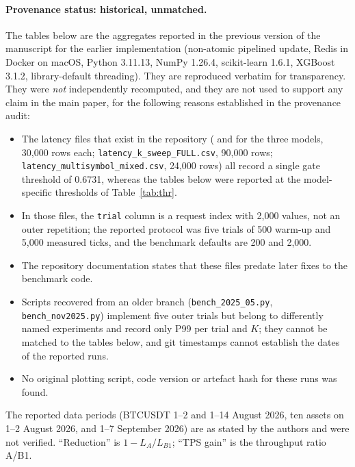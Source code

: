 \documentclass[10pt,a4paper]{article}
\begin{document}
\paragraph{Provenance status: historical, unmatched.} The tables below are the aggregates reported in the previous version of the manuscript for the earlier implementation (non-atomic pipelined update, Redis in Docker on macOS, Python 3.11.13, NumPy 1.26.4, scikit-learn 1.6.1, XGBoost 3.1.2, library-default threading). They are reproduced verbatim for transparency. They were \emph{not} independently recomputed, and they are not used to support any claim in the main paper, for the following reasons established in the provenance audit:
\begin{itemize}
\item The latency files that exist in the repository ( and  for the three models, 30,000 rows each; \texttt{latency\_k\_sweep\_FULL.csv}, 90,000 rows; \texttt{latency\_multisymbol\_mixed.csv}, 24,000 rows) all record a single gate threshold of 0.6731, whereas the tables below were reported at the model-specific thresholds of Table~\ref{tab:thr}.
\item In those files, the \texttt{trial} column is a request index with 2,000 values, not an outer repetition; the reported protocol was five trials of 500 warm-up and 5,000 measured ticks, and the benchmark defaults are 200 and 2,000.
\item The repository documentation states that these files predate later fixes to the benchmark code.
\item Scripts recovered from an older branch (\texttt{bench\_2025\_05.py}, \texttt{bench\_nov2025.py}) implement five outer trials but belong to differently named experiments and record only P99 per trial and $K$; they cannot be matched to the tables below, and git timestamps cannot establish the dates of the reported runs.
\item No original plotting script, code version or artefact hash for these runs was found.
\end{itemize}
The reported data periods (BTCUSDT 1--2 and 1--14 August 2026, ten assets on 1--2 August 2026, and 1--7 September 2026) are as stated by the authors and were not verified. ``Reduction'' is $1-L_A/L_{B1}$; ``TPS gain'' is the throughput ratio A/B1.
\end{document}
